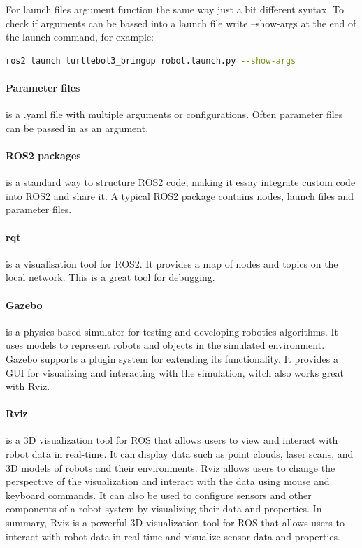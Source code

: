 For launch files argument function the same way just a bit different syntax. To check if arguments can be bassed into a launch file write --show-args at the end of the launch command, for example: 
\begin{lstlisting}[language=bash]
  ros2 launch turtlebot3_bringup robot.launch.py --show-args
\end{lstlisting}

\paragraph{Parameter files} is a .yaml file with multiple arguments or configurations. Often parameter files can be passed in as an argument.

\paragraph{ROS2 packages} is a standard way to structure ROS2 code, making it essay integrate custom code into ROS2 and share it. A typical ROS2 package contains nodes, launch files and parameter files. 

\paragraph{rqt} is a visualisation tool for ROS2. It provides a map of nodes and topics on the local network. This is a great tool for debugging. 

\paragraph{Gazebo} is a physics-based simulator for testing and developing robotics algorithms. It uses models to represent robots and objects in the simulated environment. Gazebo supports a plugin system for extending its functionality. It provides a GUI for visualizing and interacting with the simulation, witch also works great with Rviz.

\paragraph{Rviz} is a 3D visualization tool for ROS that allows users to view and interact with robot data in real-time. It can display data such as point clouds, laser scans, and 3D models of robots and their environments. Rviz allows users to change the perspective of the visualization and interact with the data using mouse and keyboard commands. It can also be used to configure sensors and other components of a robot system by visualizing their data and properties. In summary, Rviz is a powerful 3D visualization tool for ROS that allows users to interact with robot data in real-time and visualize sensor data and properties.

